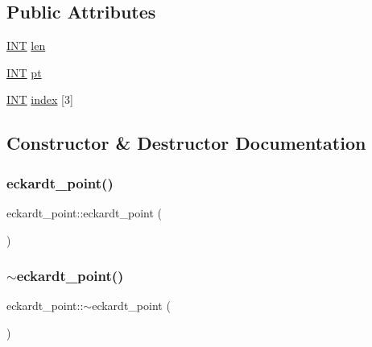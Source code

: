 \subsection*{Public Attributes}
\begin{DoxyCompactItemize}
\item 
\mbox{\hyperlink{galois_8h_a09fddde158a3a20bd2dcadb609de11dc}{I\+NT}} \mbox{\hyperlink{classeckardt__point_a4916b1b09e39328015c0d973e94132e9}{len}}
\item 
\mbox{\hyperlink{galois_8h_a09fddde158a3a20bd2dcadb609de11dc}{I\+NT}} \mbox{\hyperlink{classeckardt__point_a223c9de699c4507c2cf86c8b164163e3}{pt}}
\item 
\mbox{\hyperlink{galois_8h_a09fddde158a3a20bd2dcadb609de11dc}{I\+NT}} \mbox{\hyperlink{classeckardt__point_a65784caea35d920cb4a08b30a5ba0604}{index}} \mbox{[}3\mbox{]}
\end{DoxyCompactItemize}


\subsection{Constructor \& Destructor Documentation}
\mbox{\label{classeckardt__point_af3ff260def40b39b27c5e5805dc7c8f2}} 
\subsubsection{\texorpdfstring{eckardt\+\_\+point()}{eckardt\_point()}}
{\footnotesize\ttfamily eckardt\+\_\+point\+::eckardt\+\_\+point (\begin{DoxyParamCaption}{ }\end{DoxyParamCaption})}

\mbox{\label{classeckardt__point_a39d3361bd34251e51858dca913da44a1}} 
\subsubsection{\texorpdfstring{$\sim$eckardt\+\_\+point()}{~eckardt\_point()}}
{\footnotesize\ttfamily eckardt\+\_\+point\+::$\sim$eckardt\+\_\+point (\begin{DoxyParamCaption}{ }\end{DoxyParamCaption})}




